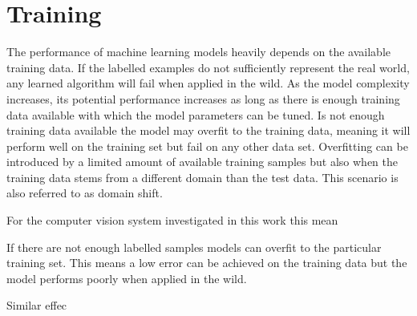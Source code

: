 \section{Training}
\label{sec:bg:training}

The performance of machine learning models heavily depends on the available training data. If the labelled examples do not sufficiently represent the real world, any learned algorithm will fail when applied in the wild. As the model complexity increases, its potential performance increases as long as there is enough training data available with which the model parameters can be tuned. Is not enough training data available the model may overfit to the training data, meaning it will perform well on the training set but fail on any other data set. Overfitting can be introduced by a limited amount of available training samples but also when the training data stems from a different domain than the test data. This scenario is also referred to as domain shift.

For the computer vision system investigated in this work this mean

If there are not enough labelled samples models can overfit to the particular training set. This means a low error can be achieved on the training data but the model performs poorly when applied in the wild.

Similar effec
